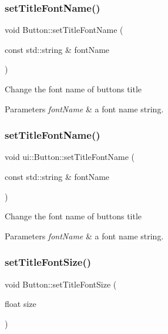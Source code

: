 \subsubsection{\texorpdfstring{set\+Title\+Font\+Name()}{setTitleFontName()}\hspace{0.1cm}{\footnotesize\ttfamily [1/2]}}
{\footnotesize\ttfamily void Button\+::set\+Title\+Font\+Name (\begin{DoxyParamCaption}\item[{const std\+::string \&}]{font\+Name }\end{DoxyParamCaption})}

Change the font name of button\textquotesingle{}s title 
\begin{DoxyParams}{Parameters}
{\em font\+Name} & a font name string. \\
\hline
\end{DoxyParams}
\mbox{\label{classui_1_1Button_a6499a94c97443010373dbf217d5bdeee}} 
\subsubsection{\texorpdfstring{set\+Title\+Font\+Name()}{setTitleFontName()}\hspace{0.1cm}{\footnotesize\ttfamily [2/2]}}
{\footnotesize\ttfamily void ui\+::\+Button\+::set\+Title\+Font\+Name (\begin{DoxyParamCaption}\item[{const std\+::string \&}]{font\+Name }\end{DoxyParamCaption})}

Change the font name of button\textquotesingle{}s title 
\begin{DoxyParams}{Parameters}
{\em font\+Name} & a font name string. \\
\hline
\end{DoxyParams}
\mbox{\label{classui_1_1Button_a8162f1f44bd3a8477b59af3073d66b69}} 
\subsubsection{\texorpdfstring{set\+Title\+Font\+Size()}{setTitleFontSize()}\hspace{0.1cm}{\footnotesize\ttfamily [1/2]}}
{\footnotesize\ttfamily void Button\+::set\+Title\+Font\+Size (\begin{DoxyParamCaption}\item[{float}]{size }\end{DoxyParamCaption})}

